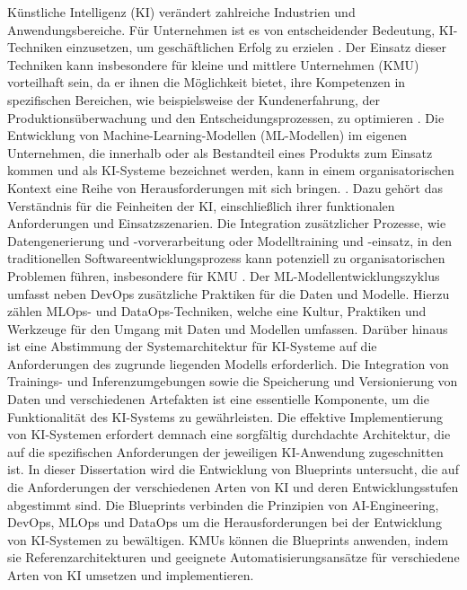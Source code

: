 \documentclass[11pt,a4paper,pointlessnumbers]{scrartcl}
\theoremstyle{break}
\numberwithin{equation}{section}
\begin{document}
Künstliche Intelligenz (KI) verändert zahlreiche Industrien und Anwendungsbereiche. Für Unternehmen ist es von entscheidender Bedeutung, KI-Techniken einzusetzen, um geschäftlichen Erfolg zu erzielen \cite{enholmArtificialIntelligenceBusiness2022, loureiroArtificialIntelligenceBusiness2021}. 
Der Einsatz dieser Techniken kann insbesondere für kleine und mittlere Unternehmen (KMU) vorteilhaft sein, da er ihnen die Möglichkeit bietet, ihre Kompetenzen in spezifischen Bereichen, wie beispielsweise der Kundenerfahrung, der Produktionsüberwachung und den Entscheidungsprozessen, zu optimieren \cite{bhaleraoStudyBarriersBenefits2022}.
Die Entwicklung von Machine-Learning-Modellen (ML-Modellen) im eigenen Unternehmen, die innerhalb oder als Bestandteil eines Produkts zum Einsatz kommen und als KI-Systeme bezeichnet werden, kann in einem organisatorischen Kontext eine Reihe von Herausforderungen mit sich bringen. \cite{fischerAISystemEngineering2020,lwakatareDevOpsAIChallenges2020,schonbergerArtificialIntelligenceSmall2023, nascimentoUnderstandingDevelopmentProcess2019}. Dazu gehört das Verständnis für die Feinheiten der KI, einschließlich ihrer funktionalen Anforderungen und Einsatzszenarien. Die Integration zusätzlicher Prozesse, wie Datengenerierung und -vorverarbeitung oder Modelltraining und -einsatz, in den traditionellen Softwareentwicklungsprozess kann potenziell zu organisatorischen Problemen führen, insbesondere für KMU \cite{schonbergerArtificialIntelligenceSmall2023}. 
Der ML-Modellentwicklungszyklus umfasst neben DevOps zusätzliche Praktiken für die Daten und Modelle. Hierzu zählen MLOps- und DataOps-Techniken, welche eine Kultur, Praktiken und Werkzeuge für den Umgang mit Daten und Modellen umfassen. 
Darüber hinaus ist eine Abstimmung der Systemarchitektur für KI-Systeme auf die Anforderungen des zugrunde liegenden Modells erforderlich. Die Integration von Trainings- und Inferenzumgebungen sowie die Speicherung und Versionierung von Daten und verschiedenen Artefakten ist eine essentielle Komponente, um die Funktionalität des KI-Systems zu gewährleisten.
Die effektive Implementierung von KI-Systemen erfordert demnach eine sorgfältig durchdachte Architektur, die auf die spezifischen Anforderungen der jeweiligen KI-Anwendung zugeschnitten ist.
In dieser Dissertation wird die Entwicklung von Blueprints untersucht, die auf die Anforderungen der verschiedenen Arten von KI und deren Entwicklungsstufen abgestimmt sind. Die Blueprints verbinden die Prinzipien von AI-Engineering, DevOps, MLOps und DataOps um die Herausforderungen bei der Entwicklung von KI-Systemen zu bewältigen. KMUs können die Blueprints anwenden, indem sie Referenzarchitekturen und geeignete Automatisierungsansätze für verschiedene Arten von KI umsetzen und implementieren.
\end{document}
